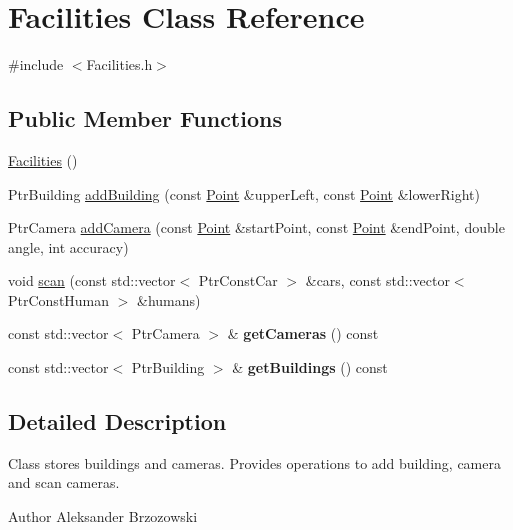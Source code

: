 \hypertarget{classFacilities}{\section{Facilities Class Reference}
\label{classFacilities}
}


{\ttfamily \#include $<$Facilities.\-h$>$}

\subsection*{Public Member Functions}
\begin{DoxyCompactItemize}
\item 
\hyperlink{classFacilities_a7a36af721fcaa3d8e7c4fbfc9000341c}{Facilities} ()
\item 
Ptr\-Building \hyperlink{classFacilities_a34c5c8682ad1ecd5b11ab9e50b59cd72}{add\-Building} (const \hyperlink{classPoint}{Point} \&upper\-Left, const \hyperlink{classPoint}{Point} \&lower\-Right)
\item 
Ptr\-Camera \hyperlink{classFacilities_a7258eef5cd708b6febf406f3474babad}{add\-Camera} (const \hyperlink{classPoint}{Point} \&start\-Point, const \hyperlink{classPoint}{Point} \&end\-Point, double angle, int accuracy)
\item 
void \hyperlink{classFacilities_a7432d9779e06c1303f25ffca7344a87b}{scan} (const std\-::vector$<$ Ptr\-Const\-Car $>$ \&cars, const std\-::vector$<$ Ptr\-Const\-Human $>$ \&humans)
\item 
\hypertarget{classFacilities_a15134d96222635cca4374a0e5aa7ea86}{const std\-::vector$<$ Ptr\-Camera $>$ \& {\bfseries get\-Cameras} () const }\label{classFacilities_a15134d96222635cca4374a0e5aa7ea86}

\item 
\hypertarget{classFacilities_aeaa02b61d7fe9a2c33829a203ae624df}{const std\-::vector$<$ Ptr\-Building $>$ \& {\bfseries get\-Buildings} () const }\label{classFacilities_aeaa02b61d7fe9a2c33829a203ae624df}

\end{DoxyCompactItemize}


\subsection{Detailed Description}
Class stores buildings and cameras. Provides operations to add building, camera and scan cameras. \begin{DoxyAuthor}{Author}
Aleksander Brzozowski 
\end{DoxyAuthor}


